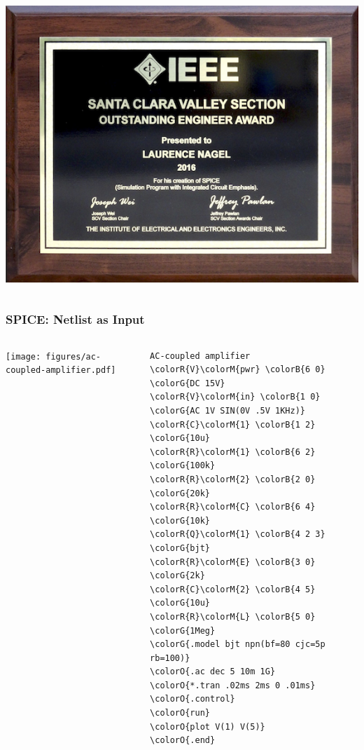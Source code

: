 \begin{frame}
\begin{columns}
\begin{column}{.3\textwidth}
\begin{center}
        \includegraphics[width=.7\textwidth]{images/Nagel_Plaque-SCV-2016.png}
      \end{center}
    \end{column}
  \end{columns}
\end{frame}

\begin{frame}[fragile]
  \frametitle{SPICE: Netlist as Input}
  \begin{columns}
    \begin{column}{.5\textwidth}
      \begin{center}
        \texttt{[image: figures/ac-coupled-amplifier.pdf]}
      \end{center}
    \end{column}
    \begin{column}{.5\textwidth}
      \footnotesize
      \begin{Verbatim}[commandchars=\\\{\}]
AC-coupled amplifier
\colorR{V}\colorM{pwr} \colorB{6 0} \colorG{DC 15V}
\colorR{V}\colorM{in} \colorB{1 0} \colorG{AC 1V SIN(0V .5V 1KHz)}
\colorR{C}\colorM{1} \colorB{1 2} \colorG{10u}
\colorR{R}\colorM{1} \colorB{6 2} \colorG{100k}
\colorR{R}\colorM{2} \colorB{2 0} \colorG{20k}
\colorR{R}\colorM{C} \colorB{6 4} \colorG{10k}
\colorR{Q}\colorM{1} \colorB{4 2 3} \colorG{bjt}
\colorR{R}\colorM{E} \colorB{3 0} \colorG{2k}
\colorR{C}\colorM{2} \colorB{4 5} \colorG{10u}
\colorR{R}\colorM{L} \colorB{5 0} \colorG{1Meg}
\colorG{.model bjt npn(bf=80 cjc=5p rb=100)}
\colorO{.ac dec 5 10m 1G}
\colorO{*.tran .02ms 2ms 0 .01ms}
\colorO{.control}
\colorO{run}
\colorO{plot V(1) V(5)}
\colorO{.end}
      \end{Verbatim}
      \normalsize
    \end{column}
  \end{columns}
\end{frame}

